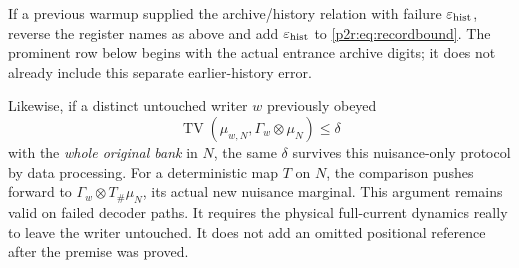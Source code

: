 \documentclass[11pt]{article}
\numberwithin{equation}{section}
\theoremstyle{definition}
\theoremstyle{remark}
\begin{document}
If a previous warmup supplied the archive/history relation with
failure $\varepsilon_{\rm hist}$, reverse the register names
as above and add $\varepsilon_{\rm hist}$ to
\eqref{p2r:eq:recordbound}. The prominent row below begins with
the actual entrance archive digits; it does not already
include this separate earlier-history error.

Likewise, if a distinct untouched writer $w$ previously obeyed
\[
 \operatorname{TV}\!\left(\mu_{w,N},\Gamma_w\otimes\mu_N\right)
       \leq\delta
\]
with the \emph{whole original bank} in $N$, the same $\delta$
survives this nuisance-only protocol by data processing.
For a deterministic map $T$ on $N$, the comparison pushes
forward to $\Gamma_w\otimes T_\#\mu_N$, its actual new nuisance
marginal. This argument remains valid on failed decoder paths.
It requires the physical full-current dynamics really to
leave the writer untouched. It does not add an omitted
positional reference after the premise was proved.
\end{document}

